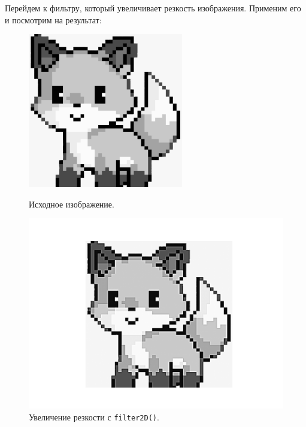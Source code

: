 \documentclass[a4paper]{article}
\begin{document}
Перейдем к фильтру, который увеличивает резкость изображения. Применим его и посмотрим на результат:

\begin{figure}[H]
  \centering
  \begin{minipage}{0.49\textwidth}
    \centering
    \includegraphics[width=\textwidth]{src/grayscale.png}
    \caption{Исходное изображение.}  
  \end{minipage}
  \begin{minipage}{0.49\textwidth}
    \centering
    \includegraphics[width=\textwidth]{src/sharpen.png}
    \caption{Увеличение резкости с \texttt{filter2D()}.}
  \end{minipage}
\end{figure}
\end{document}
